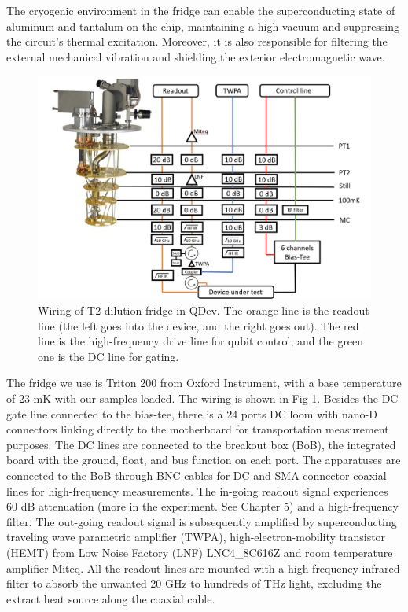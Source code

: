 The cryogenic environment in the fridge can enable the superconducting state of aluminum and tantalum on the chip, maintaining a high vacuum and suppressing the circuit's thermal excitation. Moreover, it is also responsible for filtering the external mechanical vibration and shielding the exterior electromagnetic wave.

\begin{figure}[h!]
    \centering
    \includegraphics[width=\textwidth]{Pic/FridgeSetup.png}
    \caption{Wiring of T2 dilution fridge in QDev. The orange line is the readout line (the left goes into the device, and the right goes out). The red line is the high-frequency drive line for qubit control, and the green one is the DC line for gating.}
    \label{T2wiring}
\end{figure}

The fridge we use is Triton 200 from Oxford Instrument, with a base temperature of 23 mK with our samples loaded. The wiring is shown in Fig \ref{T2wiring}. Besides the DC gate line connected to the bias-tee, there is a 24 ports DC loom with nano-D connectors linking directly to the motherboard for transportation measurement purposes. The DC lines are connected to the breakout box (BoB), the integrated board with the ground, float, and bus function on each port. The apparatuses are connected to the BoB through BNC cables for DC and SMA connector coaxial lines for high-frequency measurements. The in-going readout signal experiences 60 dB attenuation (more in the experiment. See Chapter 5) and a high-frequency filter. The out-going readout signal is subsequently amplified by superconducting traveling wave parametric amplifier (TWPA)\cite{RN70}, high-electron-mobility transistor (HEMT) from Low Noise Factory (LNF) LNC4\_8C616Z and room temperature amplifier Miteq. All the readout lines are mounted with a high-frequency infrared filter to absorb the unwanted 20 GHz to hundreds of THz light, excluding the extract heat source along the coaxial cable.


